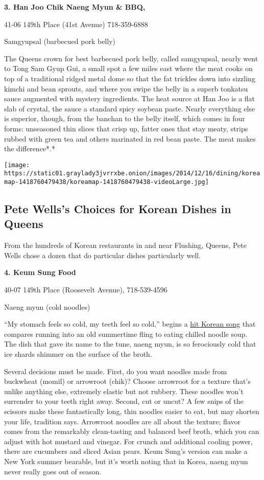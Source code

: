 \textbf{3. Han Joo Chik Naeng Myun \& BBQ,}

41-06 149th Place (41st Avenue) 718-359-6888

Samgyupsal (barbecued pork belly)

The Queens crown for best barbecued pork belly, called samgyupsal,
nearly went to Tong Sam Gyup Gui, a small spot a few miles east where
the meat cooks on top of a traditional ridged metal dome so that the fat
trickles down into sizzling kimchi and bean sprouts, and where you swipe
the belly in a superb tonkatsu sauce augmented with mystery ingredients.
The heat source at Han Joo is a flat slab of crystal, the sauce a
standard spicy soybean paste. Nearly everything else is superior,
though, from the banchan to the belly itself, which comes in four forms:
unseasoned thin slices that crisp up, fatter ones that stay meaty,
strips rubbed with green tea and others marinated in red bean paste. The
meat makes the difference*.*

\href{https://www.nytimes3xbfgragh.onion/interactive/2014/12/16/dining/koreamap.html}{}

\texttt{[image: https://static01.graylady3jvrrxbe.onion/images/2014/12/16/dining/koreamap-1418760479438/koreamap-1418760479438-videoLarge.jpg]}

\hypertarget{pete-wellss-choices-for-korean-dishes-in-queens}{%
\subsection{Pete Wells's Choices for Korean Dishes in
Queens}\label{pete-wellss-choices-for-korean-dishes-in-queens}}

From the hundreds of Korean restaurants in and near Flushing, Queens,
Pete Wells chose a dozen that do particular dishes particularly well.

\textbf{4. Keum Sung Food}

40-07 149th Place (Roosevelt Avenue), 718-539-4596

Naeng myun (cold noodles)

``My stomach feels so cold, my teeth feel so cold,'' begins a
\href{https://www.youtube.com/watch?v=0zGDQ9r36p4}{hit Korean song} that
compares running into an old summertime fling to eating chilled noodle
soup. The dish that gave its name to the tune, naeng myun, is so
ferociously cold that ice shards shimmer on the surface of the broth.

Several decisions must be made. First, do you want noodles made from
buckwheat (momil) or arrowroot (chik)? Choose arrowroot for a texture
that's unlike anything else, extremely elastic but not rubbery. These
noodles won't surrender to your teeth right away. Second, cut or uncut?
A few snips of the scissors make these fantastically long, thin noodles
easier to eat, but may shorten your life, tradition says. Arrowroot
noodles are all about the texture; flavor comes from the remarkably
clean-tasting and balanced beef broth, which you can adjust with hot
mustard and vinegar. For crunch and additional cooling power, there are
cucumbers and sliced Asian pears. Keum Sung's version can make a New
York summer bearable, but it's worth noting that in Korea, naeng myun
never really goes out of season.

